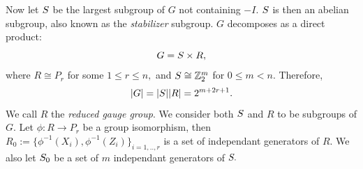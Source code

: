 \documentclass[12pt]{article}
\begin{document}
Now let $S$ be the largest subgroup of $G$ not containing
$-I.$
$S$ is then an abelian subgroup,
also known as the {\it stabilizer} subgroup.
$G$ decomposes as a direct product:
$$G = S\times R,$$
where $R\cong P_r$ for some $1\le r\le n,$
and $S\cong \mathbb{Z}_2^{m}$ for $0\le m<n.$
Therefore, 
$$|G| = |S| |R| = 2^{m+2r+1}.$$
We call $R$ the {\it reduced gauge group}.
We consider both $S$ and $R$ to be subgroups of $G.$
Let $\phi:R\to P_r$ be a group isomorphism,
then $R_0 := \{\phi^{-1}(X_i), \phi^{-1}(Z_i)\}_{i=1,..,r}$
is a set of independant generators of $R.$
We also let $S_0$ be a set of $m$ independant generators of $S.$
\end{document}
